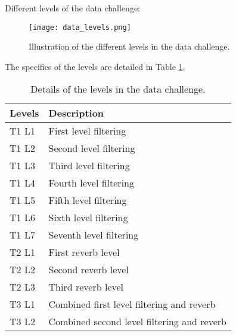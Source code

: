 \documentclass{article}
\begin{document}
Different levels of the data challenge:
\begin{figure}[h]
    \centering
    \texttt{[image: data\_levels.png]} %
    \caption{Illustration of the different levels in the data challenge.}
    \label{fig:levels}
\end{figure}

The specifics of the levels are detailed in Table \ref{tab:exp}.

\begin{table}[h]
\centering
\caption{Details of the levels in the data challenge.}
\label{tab:exp}
\begin{tabularx}{\textwidth}{|X|X|}
    \hline
    Levels & Description \\
    \hline
    T1 L1 & First level filtering \\
    \hline
    T1 L2 & Second level filtering \\
    \hline
    T1 L3 & Third level filtering \\
    \hline
    T1 L4 & Fourth level filtering \\
    \hline
    T1 L5 & Fifth level filtering \\
    \hline
    T1 L6 & Sixth level filtering \\
    \hline
    T1 L7 & Seventh level filtering \\
    \hline
    T2 L1 & First reverb level \\
    \hline
    T2 L2 & Second reverb level \\
    \hline
    T2 L3 & Third reverb level \\
    \hline
    T3 L1 & Combined first level filtering and reverb \\
    \hline
    T3 L2 & Combined second level filtering and reverb \\
    \hline
\end{tabularx}
\end{table}
\end{document}
